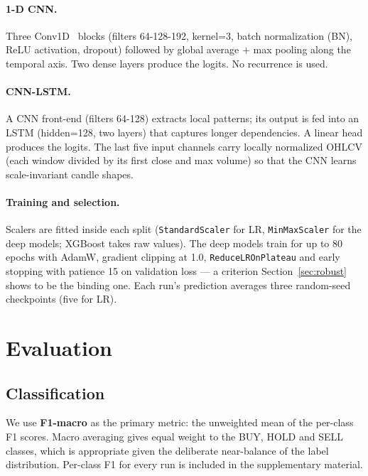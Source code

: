 \documentclass[runningheads]{llncs}
\begin{document}
\paragraph{1-D CNN.}
Three Conv1D~\cite{lecun1989} blocks (filters 64-128-192, kernel=3, batch normalization (BN), ReLU activation, dropout) followed by global average $+$ max pooling along the temporal axis. Two dense layers produce the logits. No recurrence is used.

\paragraph{CNN-LSTM.}
A CNN front-end (filters 64-128) extracts local patterns; its output is fed into an LSTM (hidden=128, two layers) that captures longer dependencies. A linear head produces the logits. The last five input channels carry locally normalized OHLCV (each window divided by its first close and max volume) so that the CNN learns scale-invariant candle shapes.

\paragraph{Training and selection.}
Scalers are fitted inside each split (\texttt{StandardScaler} for LR, \texttt{MinMaxScaler} for the deep models; XGBoost takes raw values). The deep models train for up to 80 epochs with AdamW, gradient clipping at 1.0, \texttt{ReduceLROnPlateau} and early stopping with patience 15 on validation loss --- a criterion Section~\ref{sec:robust} shows to be the binding one. Each run's prediction averages three random-seed checkpoints (five for LR).

\section{Evaluation}
\label{sec:eval}

\subsection{Classification}
We use \textbf{F1-macro} as the primary metric: the unweighted mean of the per-class F1 scores. Macro averaging gives equal weight to the BUY, HOLD and SELL classes, which is appropriate given the deliberate near-balance of the label distribution. Per-class F1 for every run is included in the supplementary material.
\end{document}
